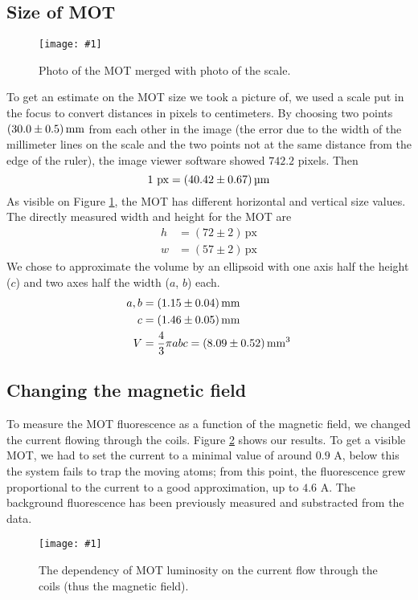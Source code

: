 \documentclass[twocolumn]{article}
\newcommand{\insertFigure}[1]{%
   \texttt{[image: \#1]}%
}
\begin{document}
\subsection{Size of MOT}
\begin{figure}
\centering
\insertFigure{Images/MOT_w_scale.png}
\caption{Photo of the MOT merged with photo of the scale.}
\label{fig:mot_w_scale}
\end{figure}
To get an estimate on the MOT size we took a picture of, we used a scale put in the focus to convert distances in pixels to centimeters. By choosing two points $\SI[separate-uncertainty = true]{30.0 \pm 0.5 }{\milli\meter}$ from each other in the image (the error due to the width of the millimeter lines on the scale and the two points not at the same distance from the edge of the ruler), the image viewer software showed $742.2$ pixels. Then
\begin{equation}
1 \text{~px} = \SI[separate-uncertainty = true]{40.42 \pm 0.67}{\micro\meter} \nonumber
\end{equation}
As visible on Figure \ref{fig:mot_w_scale}, the MOT has different horizontal and vertical size values. The directly measured width and height for the MOT are
\begin{align*}
h &= (72 \pm 2)  \, \text{px}\\
w &= (57 \pm 2)  \, \text{px} 
\end{align*}
We chose to approximate the volume by an ellipsoid with one axis half the height ($c$) and two axes half the width ($a$, $b$) each.
\begin{align*}
a, b &= \SI[separate-uncertainty = true]{1.15 \pm 0.04}{\milli\meter} \\
c &=  \SI[separate-uncertainty = true]{1.46 \pm 0.05}{\milli\meter} \\
V &= \frac{4}{3} \pi a b c = \SI[separate-uncertainty = true]{8.09 \pm 0.52 }{\cubic\milli\meter}
\end{align*}
\subsection{Changing the magnetic field}
To measure the MOT fluorescence as a function of the magnetic field, we changed the current flowing through the coils. Figure \ref{fig:magnetic} shows our results. To get a visible MOT, we had to set the current to a minimal value of around $0.9$ A, below this the system fails to trap the moving atoms; from this point, the fluorescence grew proportional to the current to a good approximation, up to $4.6$ A. The background fluorescence has been previously measured and substracted from the data.
\begin{figure}
\centering
\insertFigure{Images/magnetic_dependence_wo_linear.png}
\caption{The dependency of MOT luminosity on the current flow through the coils (thus the magnetic field).}
\label{fig:magnetic}
\end{figure}
\end{document}
